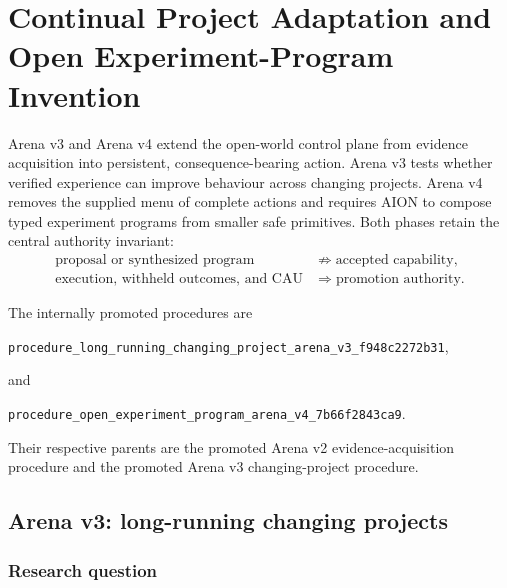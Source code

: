 
\section{Continual Project Adaptation and Open Experiment-Program Invention}
\label{sec:arena-v3-v4}

Arena v3 and Arena v4 extend the open-world control plane from evidence
acquisition into persistent, consequence-bearing action.  Arena v3 tests
whether verified experience can improve behaviour across changing projects.
Arena v4 removes the supplied menu of complete actions and requires AION to
compose typed experiment programs from smaller safe primitives.  Both phases
retain the central authority invariant:
\begin{equation}
\begin{aligned}
\text{proposal or synthesized program}
&\not\Rightarrow \text{accepted capability}, \\
\text{execution, withheld outcomes, and CAU}
&\Rightarrow \text{promotion authority}.
\end{aligned}
\label{eq:arena-v3-v4-authority}
\end{equation}

The internally promoted procedures are
\begin{center}
{\footnotesize\texttt{procedure\_long\_running\_changing\_project\_arena\_v3\_f948c2272b31}},
\end{center}
and
\begin{center}
{\footnotesize\texttt{procedure\_open\_experiment\_program\_arena\_v4\_7b66f2843ca9}}.
\end{center}
Their respective parents are the promoted Arena v2 evidence-acquisition
procedure and the promoted Arena v3 changing-project procedure.


\subsection{Arena v3: long-running changing projects}
\label{subsec:arena-v3}

\subsubsection{Research question}

